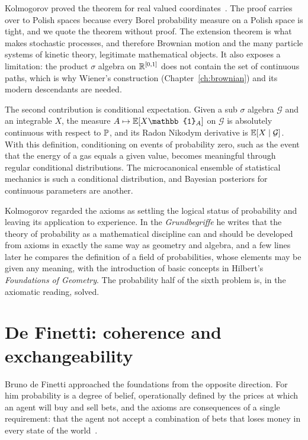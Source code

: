 Kolmogorov proved the theorem for real valued coordinates~\cite[Chapter~III, Section~4]{kolmogorov1933}. The proof carries over to Polish spaces because every Borel probability measure on a Polish space is tight, and we quote the theorem without proof. The extension theorem is what makes stochastic processes, and therefore Brownian motion and the many particle systems of kinetic theory, legitimate mathematical objects. It also exposes a limitation: the product $\sigma$ algebra on $\R^{[0,1]}$ does not contain the set of continuous paths, which is why Wiener's construction (Chapter~\ref{ch:brownian}) and its modern descendants are needed.

The second contribution is conditional expectation. Given a sub $\sigma$ algebra $\mathcal{G}$ and an integrable $X$, the measure $A\mapsto\E[X\mathbb{1}_A]$ on $\mathcal{G}$ is absolutely continuous with respect to $\P$, and its Radon Nikodym derivative is $\E[X\mid\mathcal{G}]$. With this definition, conditioning on events of probability zero, such as the event that the energy of a gas equals a given value, becomes meaningful through regular conditional distributions. The microcanonical ensemble of statistical mechanics is such a conditional distribution, and Bayesian posteriors for continuous parameters are another.

Kolmogorov regarded the axioms as settling the logical status of probability and leaving its application to experience. In the \emph{Grundbegriffe} he writes that the theory of probability as a mathematical discipline can and should be developed from axioms in exactly the same way as geometry and algebra, and a few lines later he compares the definition of a field of probabilities, whose elements may be given any meaning, with the introduction of basic concepts in Hilbert's \emph{Foundations of Geometry}. The probability half of the sixth problem is, in the axiomatic reading, solved.

\section{De Finetti: coherence and exchangeability}

Bruno de Finetti approached the foundations from the opposite direction. For him probability is a degree of belief, operationally defined by the prices at which an agent will buy and sell bets, and the axioms are consequences of a single requirement: that the agent not accept a combination of bets that loses money in every state of the world~\cite{definetti1937}.

